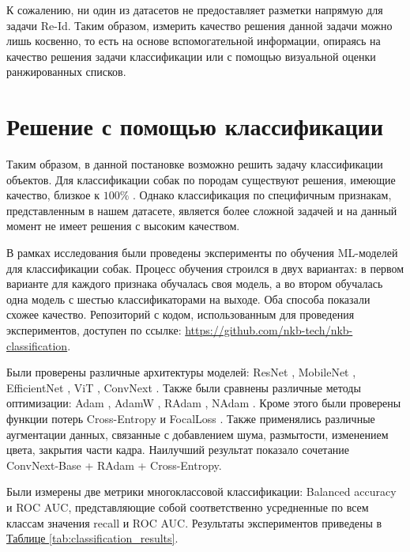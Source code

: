 К сожалению, ни один из датасетов не предоставляет разметки напрямую для задачи Re-Id. Таким образом, измерить качество решения данной задачи можно лишь косвенно, то есть на основе вспомогательной информации, опираясь на качество решения задачи классификации или с помощью визуальной оценки ранжированных списков.


\section{Решение с помощью классификации}

Таким образом, в данной постановке возможно решить задачу классификации объектов. Для классификации собак по породам существуют решения, имеющие качество, близкое к $100 \%$ \cite{bera2022sr}. Однако классификация по специфичным признакам, представленным в нашем датасете, является более сложной задачей и на данный момент не имеет решения с высоким качеством.

В рамках исследования были проведены эксперименты по обучения ML-моделей для классификации собак. Процесс обучения строился в двух вариантах: в первом варианте для каждого признака обучалась своя модель, а во втором обучалась одна модель с шестью классификаторами на выходе. Оба способа показали схожее качество. Репозиторий с кодом, использованным для проведения экспериментов, доступен по ссылке: \href{https://github.com/nkb-tech/nkb-classification}{https://github.com/nkb-tech/nkb-classification}.

Были проверены различные архитектуры моделей: ResNet \cite{he2015deep}, MobileNet \cite{howard2017mobilenets}, EfficientNet \cite{tan2019efficientnet}, ViT \cite{dosovitskiy2020image}, ConvNext \cite{liu2022convnet}. Также были сравнены различные методы оптимизации: Adam \cite{kingma2017adam}, AdamW \cite{loshchilov2019decoupled}, RAdam \cite{liu2021variance}, NAdam \cite{dozat2016incorporating}. Кроме этого были проверены функции потерь Cross-Entropy и FocalLoss \cite{lin2017focal}. Также применялись различные аугментации данных, связанные с добавлением шума, размытости, изменением цвета, закрытия части кадра. Наилучший результат показало сочетание ConvNext-Base + RAdam + Cross-Entropy.


Были измерены две метрики многоклассовой классификации: Balanced accuracy и ROC AUC, представляющие собой соответственно усредненные по всем классам значения recall и ROC AUC. Результаты экспериментов приведены в \hyperref[tab:classification_results]{Таблице \ref*{tab:classification_results}}.

